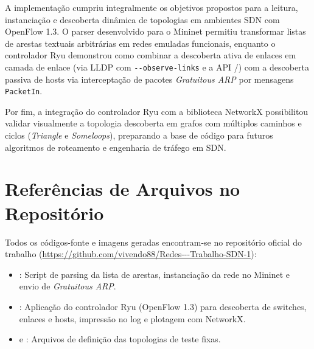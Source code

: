 \documentclass[12pt,a4paper]{article}
\begin{document}
A implementação cumpriu integralmente os objetivos propostos para a leitura, instanciação e descoberta dinâmica de topologias em ambientes SDN com OpenFlow 1.3. O parser desenvolvido para o Mininet permitiu transformar listas de arestas textuais arbitrárias em redes emuladas funcionais, enquanto o controlador Ryu demonstrou como combinar a descoberta ativa de enlaces em camada de enlace (via LLDP com \texttt{{-}{-}observe-links} e a API /) com a descoberta passiva de hosts via interceptação de pacotes \textit{Gratuitous ARP} por mensagens \texttt{PacketIn}.

Por fim, a integração do controlador Ryu com a biblioteca NetworkX possibilitou validar visualmente a topologia descoberta em grafos com múltiplos caminhos e ciclos (\textit{Triangle} e \textit{Someloops}), preparando a base de código para futuros algoritmos de roteamento e engenharia de tráfego em SDN.

\section{Referências de Arquivos no Repositório}

Todos os códigos-fonte e imagens geradas encontram-se no repositório oficial do trabalho (\url{https://github.com/vivendo88/Redes---Trabalho-SDN-1}):

\begin{itemize}
    \item {}: Script de parsing da lista de arestas, instanciação da rede no Mininet e envio de \textit{Gratuitous ARP}.
    \item {}: Aplicação do controlador Ryu (OpenFlow 1.3) para descoberta de switches, enlaces e hosts, impressão no log e plotagem com NetworkX.
    \item {} e : Arquivos de definição das topologias de teste fixas.
\end{itemize}
\end{document}
